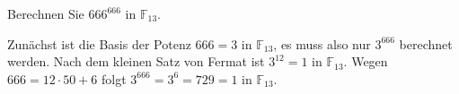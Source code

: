 Berechnen Sie $666^{666}$ in $\mathbb{F}_{13}$.

\begin{loesung}
Zunächst ist die Basis der Potenz $666=3$ in $\mathbb{F}_{13}$, es
muss also nur $3^{666}$ berechnet werden.
Nach dem kleinen Satz von Fermat ist $3^{12}=1$ in $\mathbb{F}_{13}$.
Wegen $666 = 12\cdot 50+6$ folgt
$ 3^{666} = 3^6=729=1$ in $\mathbb{F}_{13}$.
\end{loesung}
